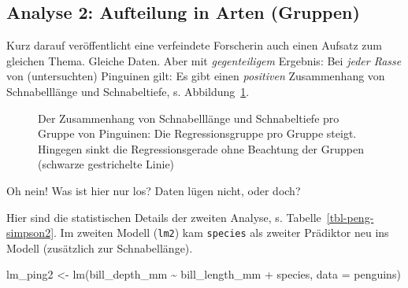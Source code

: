 \documentclass[
  letterpaper,
  oneside,
  open=any]{scrbook}
\newenvironment{Shaded}{\begin{snugshade}}{\end{snugshade}}
\newcommand{\AttributeTok}[1]{\textcolor[rgb]{0.40,0.45,0.13}{#1}}
\newcommand{\FunctionTok}[1]{\textcolor[rgb]{0.28,0.35,0.67}{#1}}
\newcommand{\NormalTok}[1]{\textcolor[rgb]{0.00,0.23,0.31}{#1}}
\newcommand{\OtherTok}[1]{\textcolor[rgb]{0.00,0.23,0.31}{#1}}
\newcommand{\SpecialCharTok}[1]{\textcolor[rgb]{0.37,0.37,0.37}{#1}}
\theoremstyle{definition}
\theoremstyle{definition}
\theoremstyle{definition}
\theoremstyle{remark}
\begin{document}
\subsection{Analyse 2: Aufteilung in Arten
(Gruppen)}\label{analyse-2-aufteilung-in-arten-gruppen}

Kurz darauf veröffentlicht eine verfeindete Forscherin auch einen
Aufsatz zum gleichen Thema. Gleiche Daten. Aber mit \emph{gegenteiligem}
Ergebnis: Bei \emph{jeder Rasse} von (untersuchten) Pinguinen gilt: Es
gibt einen \emph{positiven} Zusammenhang von Schnabelllänge und
Schnabeltiefe, s. Abbildung~\ref{fig-penguins-groups}.

\begin{figure}


\caption{\label{fig-penguins-groups}Der Zusammenhang von Schnabelllänge
und Schnabeltiefe pro Gruppe von Pinguinen: Die Regressionsgruppe pro
Gruppe steigt. Hingegen sinkt die Regressionsgerade ohne Beachtung der
Gruppen (schwarze gestrichelte Linie)}

\end{figure}%

Oh nein! Was ist hier nur los? Daten lügen nicht, oder doch?

Hier sind die statistischen Details der zweiten Analyse, s.
Tabelle~\ref{tbl-peng-simpson2}. Im zweiten Modell (\texttt{lm2}) kam
\texttt{species} als zweiter Prädiktor neu ins Modell (zusätzlich zur
Schnabellänge).

\begin{Shaded}
\begin{Highlighting}[]
\NormalTok{lm\_ping2 }\OtherTok{\textless{}{-}} \FunctionTok{lm}\NormalTok{(bill\_depth\_mm }\SpecialCharTok{\textasciitilde{}}\NormalTok{ bill\_length\_mm }\SpecialCharTok{+}\NormalTok{ species, }\AttributeTok{data =}\NormalTok{ penguins)}
\end{Highlighting}
\end{Shaded}
\end{document}
